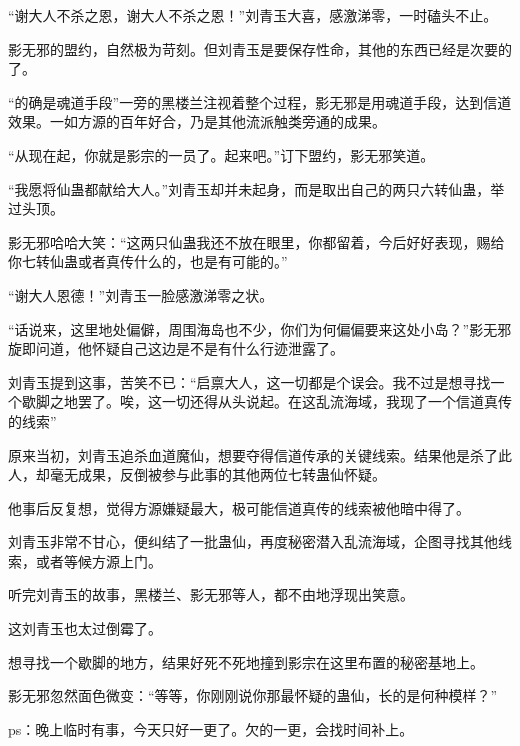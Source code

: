 \begin{this_body}
“谢大人不杀之恩，谢大人不杀之恩！”刘青玉大喜，感激涕零，一时磕头不止。

影无邪的盟约，自然极为苛刻。但刘青玉是要保存性命，其他的东西已经是次要的了。

“的确是魂道手段”一旁的黑楼兰注视着整个过程，影无邪是用魂道手段，达到信道效果。一如方源的百年好合，乃是其他流派触类旁通的成果。

“从现在起，你就是影宗的一员了。起来吧。”订下盟约，影无邪笑道。

“我愿将仙蛊都献给大人。”刘青玉却并未起身，而是取出自己的两只六转仙蛊，举过头顶。

影无邪哈哈大笑：“这两只仙蛊我还不放在眼里，你都留着，今后好好表现，赐给你七转仙蛊或者真传什么的，也是有可能的。”

“谢大人恩德！”刘青玉一脸感激涕零之状。

“话说来，这里地处偏僻，周围海岛也不少，你们为何偏偏要来这处小岛？”影无邪旋即问道，他怀疑自己这边是不是有什么行迹泄露了。

刘青玉提到这事，苦笑不已：“启禀大人，这一切都是个误会。我不过是想寻找一个歇脚之地罢了。唉，这一切还得从头说起。在这乱流海域，我现了一个信道真传的线索”

原来当初，刘青玉追杀血道魔仙，想要夺得信道传承的关键线索。结果他是杀了此人，却毫无成果，反倒被参与此事的其他两位七转蛊仙怀疑。

他事后反复想，觉得方源嫌疑最大，极可能信道真传的线索被他暗中得了。

刘青玉非常不甘心，便纠结了一批蛊仙，再度秘密潜入乱流海域，企图寻找其他线索，或者等候方源上门。

听完刘青玉的故事，黑楼兰、影无邪等人，都不由地浮现出笑意。

这刘青玉也太过倒霉了。

想寻找一个歇脚的地方，结果好死不死地撞到影宗在这里布置的秘密基地上。

影无邪忽然面色微变：“等等，你刚刚说你那最怀疑的蛊仙，长的是何种模样？”

ps：晚上临时有事，今天只好一更了。欠的一更，会找时间补上。

\end{this_body}

